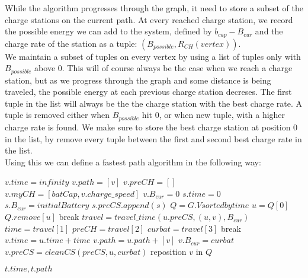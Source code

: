While the algorithm progresses through the graph, it need to store a subset of the charge stations on the current path. At every reached charge station, we record the possible energy we can add to the system, defined by $b_{cap}-B_{cur}$ and the charge rate of the station as a tuple: $(B_{possible}, R_{CH}(vertex))$.\\
We maintain a subset of tuples on every vertex by using a list of tuples only with $B_{possible}$ above 0. This will of course always be the case when we reach a charge station, but as we progress through the graph and some distance is being traveled, the possible energy at each previous charge station decreses. The first tuple in the list will always be the the charge station with the best charge rate. A tuple is removed either when $B_{possible}$ hit 0, or when new tuple, with a higher charge rate is found. We make sure to store the best charge station at position 0 in the list, by remove every tuple between the first and second best charge rate in the list.\\

Using this we can define a fastest path algorithm in the following way: \\

\begin{algorithmic}
    		\State $v.time = infinity$
		\State $v.path = [v]$
    		\State $v.preCH = []$
		\State $v.myCH = [batCap, v.charge\_speed]$
		\State $v.B_{cur} = 0$
    	\EndFor
	\State $s.time = 0$
	\State $s.B_{cur} = initialBattery$
	\State $s.preCS.append(s)$	
	\State $Q = G.V sorted by time$
		\State $u = Q[0]$
		\State $Q.remove[u]$
		 break \EndIf
			\State $travel = travel\_time(u.preCS, (u, v), B_{cur})$
			\State $time = travel[1]$
			\State $preCH = travel[2]$
			\State $curbat = travel[3]$
			 break \EndIf
				\State $v.time = u.time + time$
				\State $v.path = u.path + [v]$
				\State $v.B_{cur} = curbat$
				\State $v.preCS = cleanCS(preCS, u, curbat)$
				\State reposition $v$ in $Q$
			\EndIf

		\EndFor
	\EndWhile
	\State \Return $t.time, t.path$
\EndFunction
\end{algorithmic}\label{alg:fastest_path}
